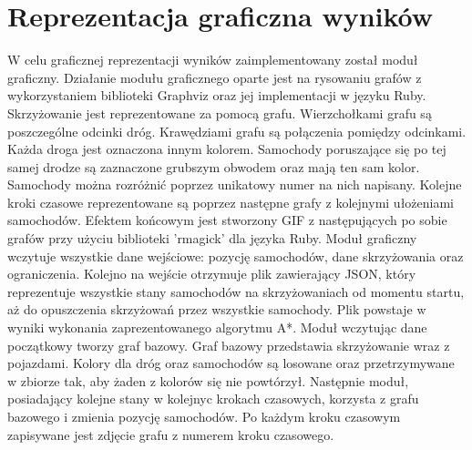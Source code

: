 \section{Reprezentacja graficzna wyników}

W celu graficznej reprezentacji wyników zaimplementowany został moduł graficzny.
\newline
\newline
Działanie modułu graficznego oparte jest na rysowaniu grafów z wykorzystaniem biblioteki Graphviz oraz jej implementacji w języku Ruby.
\newline
\newline
Skrzyżowanie jest reprezentowane za pomocą grafu. Wierzchołkami grafu są poszczególne odcinki dróg. Krawędziami grafu są połączenia pomiędzy odcinkami.
\newline
\newline
Każda droga jest oznaczona innym kolorem.
\newline
\newline
Samochody poruszające się po tej samej drodze są zaznaczone grubszym obwodem oraz mają ten sam kolor. Samochody można rozróżnić poprzez unikatowy numer na nich napisany.
\newline
\newline
Kolejne kroki czasowe reprezentowane są poprzez następne grafy z kolejnymi ułożeniami samochodów.
\newline
\newline
Efektem końcowym jest stworzony GIF z następujących po sobie grafów przy użyciu biblioteki 'rmagick' dla języka Ruby.
\newline
\newline
Moduł graficzny wczytuje wszystkie dane wejściowe: pozycję samochodów, dane skrzyżowania oraz ograniczenia. Kolejno na wejście otrzymuje plik zawierający JSON, który reprezentuje wszystkie stany samochodów na skrzyżowaniach od momentu startu, aż do opuszczenia skrzyżowań przez wszystkie samochody. Plik powstaje w wyniki wykonania zaprezentowanego algorytmu A*.
\newline
\newline
Moduł wczytując dane początkowy tworzy graf bazowy. Graf bazowy przedstawia skrzyżowanie wraz z pojazdami. Kolory dla dróg oraz samochodów są losowane oraz przetrzymywane w zbiorze tak, aby żaden z kolorów się nie powtórzył.
\newline
\newline
Następnie moduł, posiadający kolejne stany w kolejnyc krokach czasowych, korzysta z grafu bazowego i zmienia pozycję samochodów. Po każdym kroku czasowym zapisywane jest zdjęcie grafu z numerem kroku czasowego.
